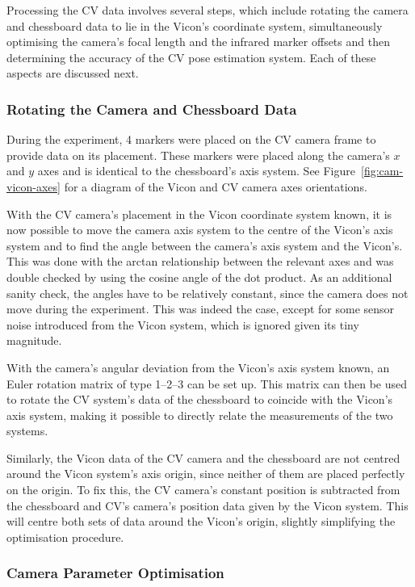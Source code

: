 Processing the CV data involves several steps, which include rotating the camera and chessboard data to lie in the Vicon's coordinate system, simultaneously optimising the camera's focal length and the infrared marker offsets and then determining the accuracy of the CV pose estimation system. Each of these aspects are discussed next.

\subsubsection{Rotating the Camera and Chessboard Data}
\label{sec:rotate-axes}

During the experiment, 4 markers were placed on the CV camera frame to provide data on its placement. These markers were placed along the camera's $x$ and $y$ axes and is identical to the chessboard's axis system. See Figure~\ref{fig:cam-vicon-axes} for a diagram of the Vicon and CV camera axes orientations.

With the CV camera's placement in the Vicon coordinate system known, it is now possible to move the camera axis system to the centre of the Vicon's axis system and to find the angle between the camera's axis system and the Vicon's. This was done with the arctan relationship between the relevant axes and was double checked by using the cosine angle of the dot product. As an additional sanity check, the angles have to be relatively constant, since the camera does not move during the experiment. This was indeed the case, except for some sensor noise introduced from the Vicon system, which is ignored given its tiny magnitude. 

With the camera's angular deviation from the Vicon's axis system known, an Euler rotation matrix of type 1--2--3 can be set up. This matrix can then be used to rotate the CV system's data of the chessboard to coincide with the Vicon's axis system, making it possible to directly relate the measurements of the two systems. 

Similarly, the Vicon data of the CV camera and the chessboard are not centred around the Vicon system's axis origin, since neither of them are placed perfectly on the origin. To fix this, the CV camera's constant position is subtracted from the chessboard and CV's camera's position data given by the Vicon system. This will centre both sets of data around the Vicon's origin, slightly simplifying the optimisation procedure. 

\subsubsection{Camera Parameter Optimisation}
\label{sec:focal-optimisation}

